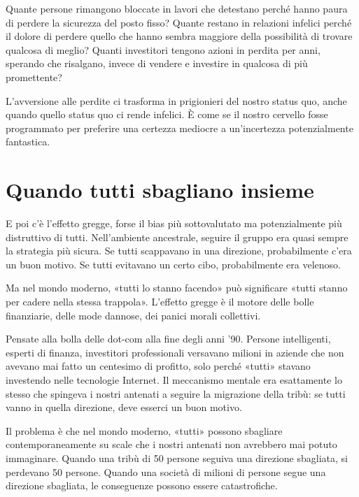 Quante persone rimangono bloccate in lavori che detestano perché hanno paura di perdere la sicurezza del posto fisso? Quante restano in relazioni infelici perché il dolore di perdere quello che hanno sembra maggiore della possibilità di trovare qualcosa di meglio? Quanti investitori tengono azioni in perdita per anni, sperando che risalgano, invece di vendere e investire in qualcosa di più promettente?

L'avversione alle perdite ci trasforma in prigionieri del nostro status quo, anche quando quello status quo ci rende infelici. È come se il nostro cervello fosse programmato per preferire una certezza mediocre a un'incertezza potenzialmente fantastica.

\medskip

\section{Quando tutti sbagliano insieme}
\label{sec:p4c8-quando-tutti-sbagliano}
E poi c'è l'effetto gregge, forse il bias più sottovalutato ma potenzialmente più distruttivo di tutti. Nell'ambiente ancestrale, seguire il gruppo era quasi sempre la strategia più sicura. Se tutti scappavano in una direzione, probabilmente c'era un buon motivo. Se tutti evitavano un certo cibo, probabilmente era velenoso.

Ma nel mondo moderno, «tutti lo stanno facendo» può significare «tutti stanno per cadere nella stessa trappola». L'effetto gregge è il motore delle bolle finanziarie, delle mode dannose, dei panici morali collettivi.

Pensate alla bolla delle dot-com alla fine degli anni '90. Persone intelligenti, esperti di finanza, investitori professionali versavano milioni in aziende che non avevano mai fatto un centesimo di profitto, solo perché «tutti» stavano investendo nelle tecnologie Internet. Il meccanismo mentale era esattamente lo stesso che spingeva i nostri antenati a seguire la migrazione della tribù: se tutti vanno in quella direzione, deve esserci un buon motivo.

Il problema è che nel mondo moderno, «tutti» possono sbagliare contemporaneamente su scale che i nostri antenati non avrebbero mai potuto immaginare. Quando una tribù di 50 persone seguiva una direzione sbagliata, si perdevano 50 persone. Quando una società di milioni di persone segue una direzione sbagliata, le conseguenze possono essere catastrofiche.

\bigskip

